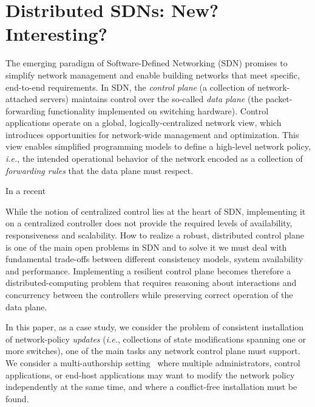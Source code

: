 \documentclass[11pt,pdftex,letter]{article}
\newcommand{\ie}{{\it i.e.}}
\begin{document}
\section{Distributed SDNs: New? Interesting?}

The emerging paradigm of Software-Defined Networking (SDN) promises to
simplify network management and enable building networks
that meet specific, end-to-end requirements.
In SDN, the \emph{control plane}  (a collection of network-attached servers)
maintains control over the so-called \emph{data plane} (the
packet-forwarding functionality implemented on switching
hardware). Control applications operate on a global, logically-centralized network view,
which introduces opportunities for network-wide management and optimization.
This view enables simplified programming models to define a high-level
network policy, \ie, the intended operational behavior of the network
encoded as a collection of \emph{forwarding rules} that the data plane must respect.

In a recent 

While the notion of centralized control lies at the heart of SDN,
implementing it on a centralized controller does not provide the required
levels of availability, responsiveness and scalability.
How to realize a robust, distributed control plane is one of the main open problems in
SDN
and to solve it we must deal with
fundamental trade-offs between
different consistency models, system availability and performance.
%
Implementing a resilient control plane becomes therefore a
distributed-computing problem that requires reasoning about
interactions and concurrency between the controllers while preserving
correct operation of the data plane.

In this paper, as a case study, we consider the problem of consistent
installation of network-policy \emph{updates} (\ie, collections of
state modifications spanning one or more switches),
one of the main tasks any network control
plane must support.
We consider a multi-authorship setting~\cite{Ferguson2013} where multiple
administrators, control applications, or end-host
applications may want to modify the network policy
independently at the same time, and where a conflict-free installation must be
found.
\end{document}
